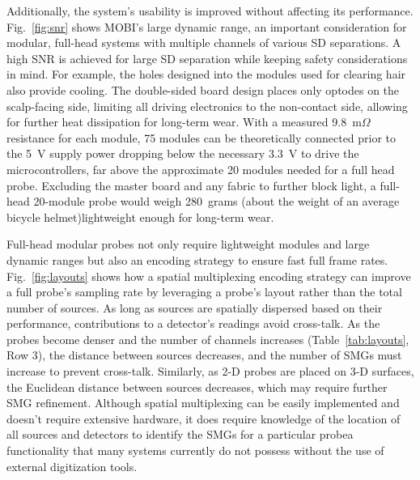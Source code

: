 Additionally, the system's usability is improved without affecting its performance. Fig.~\ref{fig:snr} shows \ac{MOBI}'s large dynamic range, an important consideration for modular, full-head systems with multiple channels of various \ac{SD} separations. A high \ac{SNR} is achieved for large \ac{SD} separation while keeping safety considerations in mind. For example, the holes designed into the modules used for clearing hair also provide cooling. The double-sided board design places only optodes on the scalp-facing side, limiting all driving electronics to the non-contact side, allowing for further heat dissipation for long-term wear. With a measured 9.8~m$\Omega$ resistance for each module, 75 modules can be theoretically connected prior to the 5~V supply power dropping below the necessary 3.3~V to drive the microcontrollers, far above the approximate 20 modules needed for a full head probe. Excluding the master board and any fabric to further block light, a full-head 20-module probe would weigh 280~grams (about the weight of an average bicycle helmet)\textemdash lightweight enough for long-term wear. %

Full-head modular probes not only require lightweight modules and large dynamic ranges but also an encoding strategy to ensure fast full frame rates. Fig.~\ref{fig:layouts} shows how a spatial multiplexing encoding strategy can improve a full probe's sampling rate by leveraging a probe's layout rather than the total number of sources. As long as sources are spatially dispersed based on their performance, contributions to a detector's readings avoid cross-talk. As the probes become denser and the number of channels increases (Table~\ref{tab:layouts}, Row 3), the distance between sources decreases, and the number of \ac{SMG}s must increase to prevent cross-talk. Similarly, as 2-D probes are placed on 3-D surfaces, the Euclidean distance between sources decreases, which may require further \ac{SMG} refinement. Although spatial multiplexing can be easily implemented and doesn't require extensive hardware, it does require knowledge of the location of all sources and detectors to identify the \ac{SMG}s for a particular probe\textemdash a functionality that many systems currently do not possess without the use of external digitization tools.  

